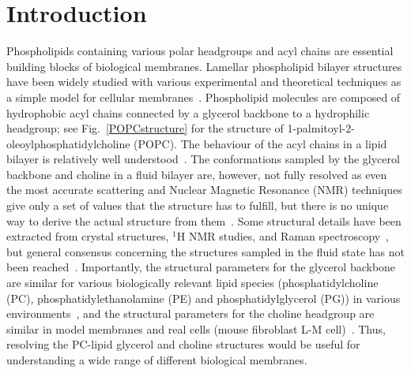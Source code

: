 \documentclass[journal=jacsat,manuscript=article]{achemso}
\begin{document}
\section{Introduction}

Phospholipids containing various polar headgroups and acyl chains are essential building blocks of 
biological membranes. Lamellar phospholipid bilayer structures have been widely studied with various experimental 
and theoretical techniques as a simple model for cellular membranes~\cite{lipowsky95,tieleman97,klauda08,edholm08,tieleman10,piggot12,rabinovich13,marsh13}. 
Phospholipid molecules are composed of hydrophobic acyl chains connected by a glycerol backbone to a hydrophilic headgroup;
see Fig.~\ref{POPCstructure} for the structure of 1-palmitoyl-2-oleoyl\-phosphatidyl\-choline (POPC).
The behaviour of the acyl chains in a lipid bilayer is relatively well understood~\cite{Israelachvili80,lipowsky95,tieleman97,klauda08,edholm08,tieleman10,marsh13}. 
The conformations sampled by the glycerol backbone and choline in a fluid bilayer are, however, not fully 
resolved as even the most accurate scattering and Nuclear Magnetic Resonance (NMR)
techniques give only a set of values that the structure has to fulfill, but
there is no unique way to derive the actual structure from them~\cite{seelig77b,skarjune79,Israelachvili80,jacobs80,davis83,strenk85,akutsu91,hong95b,hong96,semchyschyn04}.
Some structural details have been extracted from crystal structures, $^1$H NMR studies, and Raman spectroscopy~\cite{hauser80,hauser81,hauser81b,akutsu81b,pascher92,hauser88,marsh06},
but general consensus concerning the structures sampled in the fluid state has not been reached~\cite{seelig77b,skarjune79,Israelachvili80,jacobs80,davis83,strenk85,hauser88,akutsu91,hong95b,hong96,semchyschyn04,marsh06}. 
Importantly, the structural parameters for the glycerol backbone are similar for various biologically
relevant lipid species (phosphatidylcholine (PC), phosphatidylethanolamine (PE) and phosphatidylglycerol (PG)) 
in various environments~\cite{gally81}, and the structural parameters for the choline headgroup are similar in model membranes and
real cells (mouse fibroblast L-M cell)~\cite{scherer87}.
Thus, resolving the PC-lipid glycerol and choline structures would be 
useful for understanding a wide range of different biological membranes.
\end{document}
